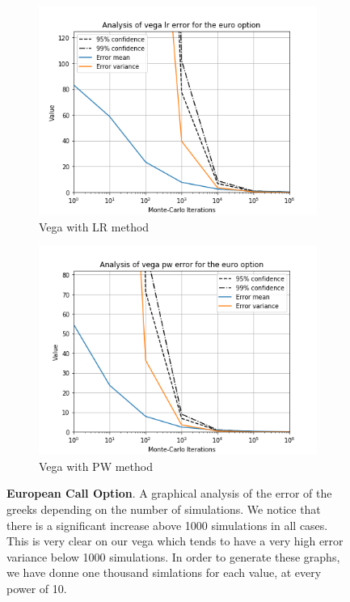 \documentclass[11pt,a4paper,fleqn]{article}
\begin{document}
\begin{figure}[h!]
      \begin{subfigure}[b]{0.45\textwidth}
          \includegraphics[width=\textwidth]{graphs/eurovegalr.png}
          \caption{Vega with LR method}
      \end{subfigure}
      \begin{subfigure}[b]{0.45\textwidth}
          \includegraphics[width=\textwidth]{graphs/eurovegapw.png}
          \caption{Vega with PW method}
      \end{subfigure}

      \caption{\textbf{European Call Option}. A graphical analysis of the error of the greeks depending on the number of simulations. We notice that there is a significant increase above 1000 simulations in all cases. This is very clear on our vega which tends to have a very high error variance below 1000 simulations. In order to generate these graphs, we have donne one thousand simlations for each value, at every power of 10.}
\end{figure}
\end{document}
